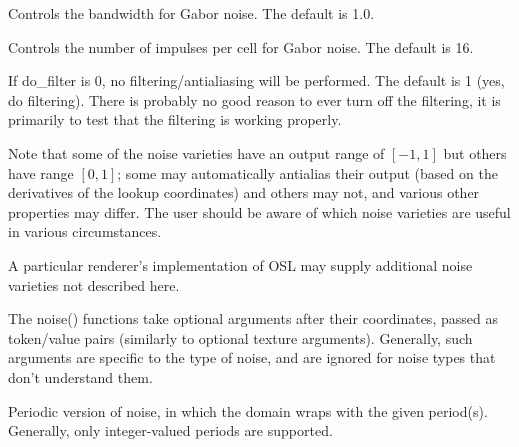 \documentclass[11pt,letterpaper]{book}
\begin{document}
\vspace{12pt}
Controls the bandwidth for Gabor noise.
The default is 1.0.
\apiend
\vspace{-16pt}

\vspace{12pt}
Controls the number of impulses per cell for Gabor noise.
The default is 16.
\apiend
\vspace{-16pt}

\vspace{12pt}
If {\cf do_filter} is 0, no filtering/antialiasing will
be performed.  The default is 1 (yes, do filtering).  There is probably
no good reason to ever turn off the filtering, it is primarily to test
that the filtering is working properly.
\apiend
\vspace{-16pt}

\apiend


Note that some of the noise varieties have an output range of $[-1,1]$
but others have range $[0,1]$; some may automatically antialias their
output (based on the derivatives of the lookup coordinates) and others
may not, and various other properties may differ.  The user should be
aware of which noise varieties are useful in various circumstances.

A particular renderer's implementation of OSL may supply additional
noise varieties not described here.

The {\cf noise()} functions take optional arguments after their
coordinates, passed as token/value pairs (similarly to optional texture
arguments).  Generally, such arguments are specific to the type of
noise, and are ignored for noise types that don't understand them.

\apiend




Periodic version of {\cf noise}, in which the domain wraps with the given
period(s).  Generally, only integer-valued periods are supported.
\apiend
\end{document}
